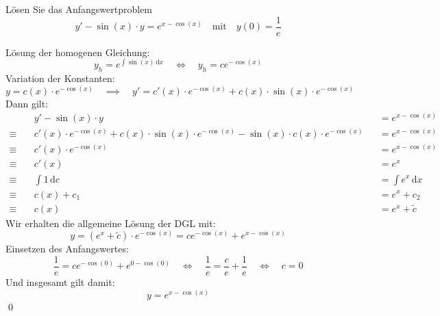 \documentclass[answers]{exam}
\renewcommand{\d}{\,\mathrm{d}}
\begin{document}
\begin{questions}
    \newpage
    \question
    Lösen Sie das Anfangswertproblem
    $$
        y' - \sin(x) \cdot y = e^{x-\cos(x)} \quad \text{mit} \quad y(0) = \frac{1}{e}
    $$
    \begin{solution}
        Lösung der homogenen Gleichung:
        $$
            y_h = e^{\int \sin(x) \d x} \quad \iff \quad y_h = ce^{-\cos(x)}
        $$
        Variation der Konstanten:
        $$
            y = c(x) \cdot e^{-\cos(x)} \quad \implies \quad y' = c'(x) \cdot e^{-\cos(x)} + c(x) \cdot \sin(x) \cdot e^{-\cos(x)}
        $$
        Dann gilt:
        $$
            \begin{aligned}
                             & y' - \sin(x) \cdot y                                                                                     &  & = e^{x-\cos(x)}   \\
                \equiv \quad & c'(x) \cdot e^{-\cos(x)} + c(x) \cdot \sin(x) \cdot e^{-\cos(x)} - \sin(x) \cdot c(x) \cdot e^{-\cos(x)} &  & = e^{x-\cos(x)}   \\
                \equiv \quad & c'(x) \cdot e^{-\cos(x)}                                                                                 &  & = e^{x-\cos(x)}   \\
                \equiv \quad & c'(x)                                                                                                    &  & = e^{x}           \\
                \equiv \quad & \int 1 \d c                                                                                              &  & = \int e^{x} \d x \\
                \equiv \quad & c(x) + c_1                                                                                               &  & = e^x + c_2       \\
                \equiv \quad & c(x)                                                                                                     &  & = e^x + \tilde{c}
            \end{aligned}
        $$
        Wir erhalten die allgemeine Lösung der DGL mit:
        $$
            y = \left(e^x + \tilde{c}\right) \cdot e^{-\cos(x)} = ce^{-\cos(x)} + e^{x-\cos(x)}
        $$
        Einsetzen des Anfangswertes:
        $$
            \frac{1}{e} = ce^{-\cos(0)} + e^{0-\cos(0)} \quad \iff \quad \frac{1}{e} = \frac{c}{e} + \frac{1}{e} \quad \iff \quad c = 0
        $$
        Und insgesamt gilt damit:
        $$
            y = e^{x-\cos(x)}
        $$\qed
    \end{solution}


\end{questions}
\end{document}
